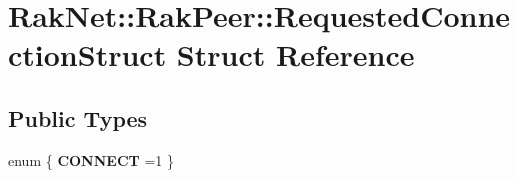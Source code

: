 \hypertarget{struct_rak_net_1_1_rak_peer_1_1_requested_connection_struct}{\section{Rak\-Net\-:\-:Rak\-Peer\-:\-:Requested\-Connection\-Struct Struct Reference}
\label{struct_rak_net_1_1_rak_peer_1_1_requested_connection_struct}
}
\subsection*{Public Types}
\begin{DoxyCompactItemize}
\item 
enum \{ {\bfseries C\-O\-N\-N\-E\-C\-T} =1
 \}
\end{DoxyCompactItemize}
